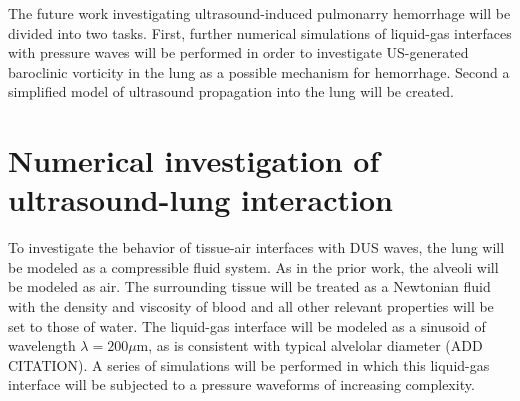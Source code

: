 \begin{comment}  Move this stuff to introduction
There has been a significant amount of prior research into ultrasound-induced pulmonary hemorrhage, but in spite of this there are still many questions left unanswered.  Presently the underlying damage mechanism causing the hemorrhage is not currently known.  Research has shown that the underlying mechanism of US-induced pulmonary hemorrhage is non-thermal. \citet{Zachary2006a}, for instance, compared lesions generated with DUS to those generated via laser and found multiple differences in the injured tissue. Other studies have shown that inertial cavitation, the intially suspected mechanism, is also unlikely to be responsible for the US-induced PH. \citet{Raeman1997} injected the UCA Albunex, which is expected to nucleate cavitation when exposed to US, into mice before performing pulmonarry US and showed that the hemorrhage was similar to that observed in control mice injected with saline.  In a later study \citet{Obrien2000} placed mice under increased hydrostatic pressure, to suppress the occurence of inertial cavitation, before exposure to pulmonarry US, and found that hemorrohage was enhanced by the increased pressure. While it is widely suspected that the cause of the hemorrhage is mechanical, the precise underlying mechanism by which acoustic energy is tranduced into mechanical stress and strain in the capillary has remained elusive.  

We hypothesize that sharp pressure gradients in the US wave interact with the strong density gradients at the blood-air barriers in the lungs, in turn generating baroclinic vorticity at the interface between the alveoli and the adjacent capillary sheets.  Furthermore, we propose that this vorticity drives the growth of this interface, causing strain, stress, and ultimately failure.
\end{comment}


The future work investigating ultrasound-induced pulmonarry hemorrhage will be divided into two tasks.  First, further numerical simulations of liquid-gas interfaces with pressure waves will be performed in order to investigate US-generated baroclinic vorticity in the lung as a possible mechanism for hemorrhage. Second a simplified model of ultrasound propagation into the lung will be created.

\section{Numerical investigation of ultrasound-lung interaction}
To investigate the behavior of tissue-air interfaces with DUS waves, the lung will be modeled as a compressible fluid system.  As in the prior work, the alveoli will be modeled as air. The surrounding tissue will be treated as a Newtonian fluid with the density and viscosity of blood and all other relevant properties will be set to those of water. The liquid-gas interface will be modeled as a sinusoid of wavelength $\lambda=200\mu$m, as is consistent with typical alvelolar diameter (ADD CITATION). A series of simulations will be performed in which this liquid-gas interface will be subjected to a pressure waveforms of increasing complexity.

